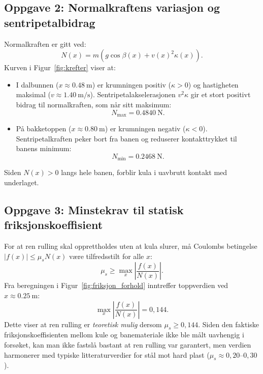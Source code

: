 \documentclass[11pt,a4paper]{article}
\begin{document}
\subsection*{Oppgave 2: Normalkraftens variasjon og sentripetalbidrag}
Normalkraften er gitt ved:
\begin{equation}
    N(x) = m\left(g\cos\beta(x) + v(x)^2\kappa(x)\right).
    \tag{S2}
\end{equation}
Kurven i Figur~\ref{fig:krefter} viser at:
\begin{itemize}
    \item I dalbunnen ($x \approx \SI{0,48}{\meter}$) er krumningen positiv ($\kappa > 0$) og hastigheten maksimal ($v \approx \SI{1,40}{\meter\per\second}$). Sentripetalakselerasjonen $v^2\kappa$ gir et stort positivt bidrag til normalkraften, som når sitt maksimum:
    \begin{equation*}
        N_{\max} = \SI{0,4840}{\newton}.
    \end{equation*}
    \item På bakketoppen ($x \approx \SI{0,80}{\meter}$) er krumningen negativ ($\kappa < 0$). Sentripetalkraften peker bort fra banen og reduserer kontakttrykket til banens minimum:
    \begin{equation*}
        N_{\min} = \SI{0,2468}{\newton}.
    \end{equation*}
\end{itemize}
Siden $N(x) > 0$ langs hele banen, forblir kula i uavbrutt kontakt med underlaget.

\subsection*{Oppgave 3: Minstekrav til statisk friksjonskoeffisient}
For at ren rulling skal opprettholdes uten at kula slurer, må Coulombs betingelse $|f(x)| \le \mu_s N(x)$ være tilfredsstilt for alle $x$:
\begin{equation}
    \mu_s \ge \max_{x} \left|\frac{f(x)}{N(x)}\right|.
    \tag{S3}
\end{equation}
Fra beregningen i Figur~\ref{fig:friksjon_forhold} inntreffer toppverdien ved $x \approx \SI{0,25}{\meter}$:
\begin{equation*}
    \max_{x} \left|\frac{f(x)}{N(x)}\right| = 0{,}144.
\end{equation*}
Dette viser at ren rulling er \emph{teoretisk mulig} dersom $\mu_s \ge 0{,}144$. Siden den faktiske friksjonskoeffisienten mellom kule og banemateriale ikke ble målt uavhengig i forsøket, kan man ikke fastslå bastant at ren rulling var garantert, men verdien harmonerer med typiske litteraturverdier for stål mot hard plast ($\mu_s \approx 0{,}20$--$0{,}30$).
\end{document}
